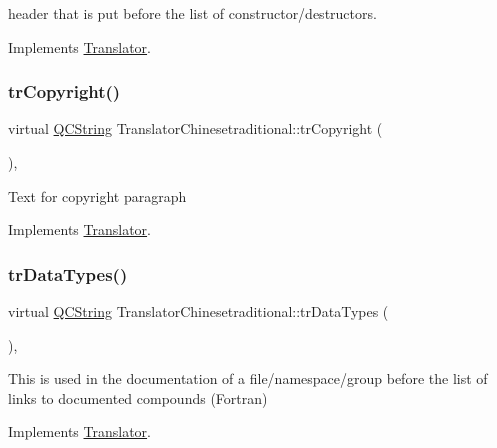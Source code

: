 header that is put before the list of constructor/destructors. 

Implements \mbox{\hyperlink{class_translator}{Translator}}.

\mbox{\label{class_translator_chinesetraditional_a29d2d31637c35174fd2aea7997837d9f}} 
\subsubsection{\texorpdfstring{trCopyright()}{trCopyright()}}
{\footnotesize\ttfamily virtual \mbox{\hyperlink{class_q_c_string}{Q\+C\+String}} Translator\+Chinesetraditional\+::tr\+Copyright (\begin{DoxyParamCaption}{ }\end{DoxyParamCaption})\hspace{0.3cm}{\ttfamily [inline]}, {\ttfamily [virtual]}}

Text for copyright paragraph 

Implements \mbox{\hyperlink{class_translator}{Translator}}.

\mbox{\label{class_translator_chinesetraditional_a9b06a74c7f0ac92241fa1ab21ea9115e}} 
\subsubsection{\texorpdfstring{trDataTypes()}{trDataTypes()}}
{\footnotesize\ttfamily virtual \mbox{\hyperlink{class_q_c_string}{Q\+C\+String}} Translator\+Chinesetraditional\+::tr\+Data\+Types (\begin{DoxyParamCaption}{ }\end{DoxyParamCaption})\hspace{0.3cm}{\ttfamily [inline]}, {\ttfamily [virtual]}}

This is used in the documentation of a file/namespace/group before the list of links to documented compounds (Fortran) 

Implements \mbox{\hyperlink{class_translator}{Translator}}.


